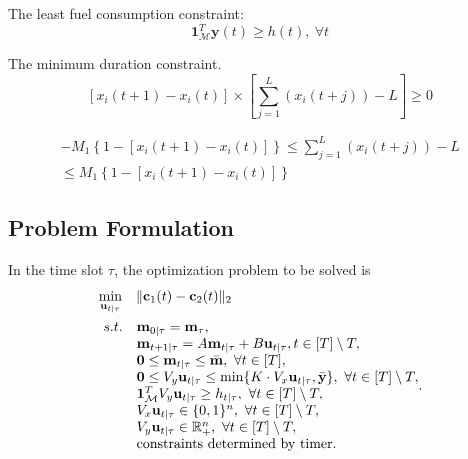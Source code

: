 \documentclass[english]{cccconf}
\begin{document}
The least fuel consumption constraint:
\begin{equation}\label{eq:least_fuel_consumption_constraint}
\mathbf{1}_{\mathcal{M}}^T\mathbf{y}(t)\geq h(t), ~\forall t
\end{equation}

The minimum duration constraint.
\begin{equation}\label{minimum_duration_constraint}
  [x_i(t+1) - x_i(t)]\times\left[\sum_{j=1}^L(x_i(t+j))-L\right]\geq 0
\end{equation}

\begin{equation}\label{continue constraint}
\begin{split}
    -M_1\left\{1-[x_i(t+1)-x_i(t)]\right\} \leq \sum_{j=1}^L(x_i(t+j))-L \\ \leq M_1\left\{1-[x_i(t+1)-x_i(t)]\right\}
\end{split}
\end{equation}


\subsection{Problem Formulation}
In the time slot $\tau$, the optimization problem to be solved is 
\begin{equation}
\begin{aligned}
  &\min_{\textbf{u}_{t|\tau}} \quad \lVert \textbf{c}_1(t) - \textbf{c}_2(t)\rVert_2\\
  & \begin{array}{r@{\quad}l@{}l@{\quad}l}
  s.t.& \textbf{m}_{0|\tau} = \textbf{m}_{\tau},\\
  & \textbf{m}_{t+1|\tau} = A\textbf{m}_{t|\tau}+ B\textbf{u}_{t|\tau}, t \in [T]\setminus T,\\
  & \mathbf{0} \leq \mathbf{m}_{t|\tau} \leq \bar{\mathbf{m}}, ~\forall t \in [T],\\
  & \mathbf{0} \leq V_{y}\mathbf{u}_{t|\tau} \leq \min \{K\cdot V_{x}\mathbf{u}_{t|\tau},\bar{\textbf{y}}\}, ~\forall t \in [T]\setminus T,\\
  & \mathbf{1}_{\mathcal{M}}^TV_{y}\mathbf{u}_{t|\tau}\geq h_{t|\tau}, ~\forall t \in [T]\setminus T,\\
  & V_{x}\mathbf{u}_{t|\tau} \in \{0,1\}^{n},~\forall t \in [T]\setminus T,\\
  & V_{y}\mathbf{u}_{t|\tau}\in \mathbb{R}_{+}^{n},~\forall t \in [T]\setminus T,\\
  & \text{constraints determined by timer.}
\end{array} .
\end{aligned}
\end{equation}
\end{document}
